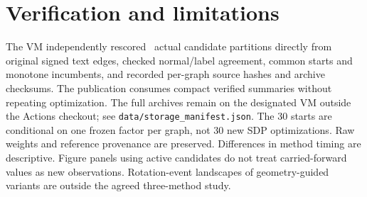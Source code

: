 \documentclass[11pt,a4paper]{article}
\begin{document}
\section{Verification and limitations}
The VM independently rescored \AuditCount\ actual candidate partitions directly from original signed text edges, checked normal/label agreement, common starts and monotone incumbents, and recorded per-graph source hashes and archive checksums. The publication consumes compact verified summaries without repeating optimization. The full archives remain on the designated VM outside the Actions checkout; see \texttt{data/storage\_manifest.json}. The 30 starts are conditional on one frozen factor per graph, not 30 new SDP optimizations. Raw weights and reference provenance are preserved. Differences in method timing are descriptive. Figure panels using active candidates do not treat carried-forward values as new observations. Rotation-event landscapes of geometry-guided variants are outside the agreed three-method study.

\end{document}
